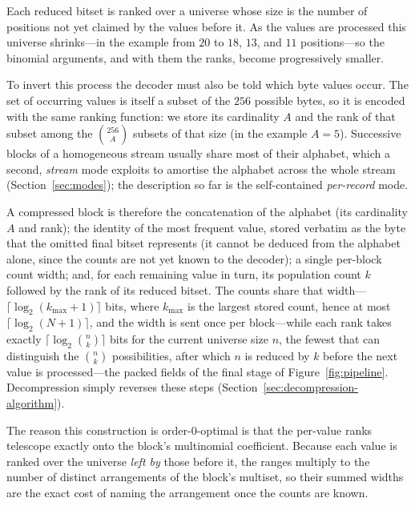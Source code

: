 \documentclass[entropy,article,submit,oneauthor,pdftex]{Definitions/mdpi}
\begin{document}
Each reduced bitset is ranked over a universe whose size is the number of positions not yet claimed by the values before it. As the values are processed this universe shrinks---in the example from $20$ to $18$, $13$, and $11$ positions---so the binomial arguments, and with them the ranks, become progressively smaller.

To invert this process the decoder must also be told which byte values occur. The
set of occurring values is itself a subset of the $256$ possible bytes, so it is
encoded with the same ranking function: we store its cardinality $A$ and the rank
of that subset among the $\binom{256}{A}$ subsets of that size (in the example
$A=5$). Successive blocks of a homogeneous stream usually share most of their alphabet,
which a second, \emph{stream} mode exploits to amortise the alphabet across the
whole stream (Section~\ref{sec:modes}); the description so far is the self-contained
\emph{per-record} mode.

A compressed block is therefore the concatenation of the alphabet (its cardinality
$A$ and rank); the identity of the most frequent value, stored verbatim as the byte
that the omitted final bitset represents (it cannot be deduced from the alphabet alone,
since the counts are not yet known to the decoder); a single per-block count width; and,
for each remaining value in turn, its population count $k$ followed by the rank of its
reduced bitset. The counts share that width---$\lceil\log_2(k_{\max}{+}1)\rceil$ bits,
where $k_{\max}$ is the largest stored count, hence at most $\lceil\log_2(N{+}1)\rceil$,
and the width is sent once per block---while each rank takes exactly
$\lceil\log_2\binom{n}{k}\rceil$ bits for the current universe size $n$, the fewest that
can distinguish the $\binom{n}{k}$ possibilities, after which $n$ is reduced by $k$ before
the next value is processed---the packed fields of the final stage of
Figure~\ref{fig:pipeline}. Decompression simply reverses these steps
(Section~\ref{sec:decompression-algorithm}).

The reason this construction is order-$0$-optimal is that the per-value ranks
telescope exactly onto the block's multinomial coefficient. Because each value
is ranked over the universe \emph{left by} those before it, the ranges multiply
to the number of distinct arrangements of the block's multiset, so their summed
widths are the exact cost of naming the arrangement once the counts are known.
\end{document}
